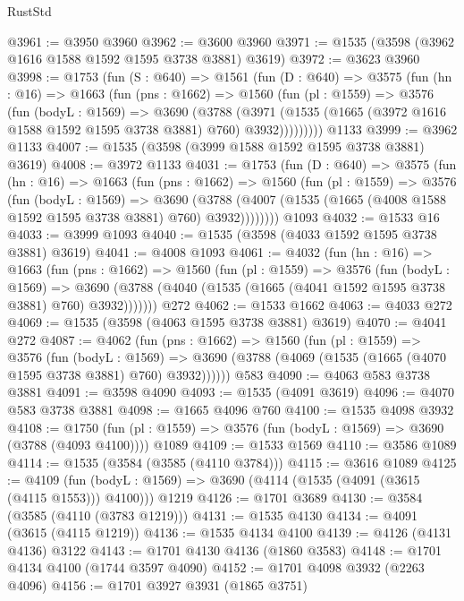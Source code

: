 \begin{lexlean}{RustStd}
\begin{coremodule}
@3961 := @3950 @3960
@3962 := @3600 @3960
@3971 := @1535 (@3598 (@3962 @1616 @1588 @1592 @1595 @3738 @3881) @3619)
@3972 := @3623 @3960
@3998 := @1753
    (fun (S : @640) =>
    @1561
      (fun (D : @640) =>
      @3575
        (fun (hn : @16) =>
        @1663
          (fun (pns : @1662) =>
          @1560
            (fun (pl : @1559) =>
            @3576
              (fun (bodyL : @1569) =>
              @3690
                (@3788
                  (@3971
                    (@1535 (@1665 (@3972 @1616 @1588 @1592 @1595 @3738 @3881) @760) @3932)))))))))
    @1133
@3999 := @3962 @1133
@4007 := @1535 (@3598 (@3999 @1588 @1592 @1595 @3738 @3881) @3619)
@4008 := @3972 @1133
@4031 := @1753
    (fun (D : @640) =>
    @3575
      (fun (hn : @16) =>
      @1663
        (fun (pns : @1662) =>
        @1560
          (fun (pl : @1559) =>
          @3576
            (fun (bodyL : @1569) =>
            @3690
              (@3788 (@4007 (@1535 (@1665 (@4008 @1588 @1592 @1595 @3738 @3881) @760) @3932))))))))
    @1093
@4032 := @1533 @16
@4033 := @3999 @1093
@4040 := @1535 (@3598 (@4033 @1592 @1595 @3738 @3881) @3619)
@4041 := @4008 @1093
@4061 := @4032
    (fun (hn : @16) =>
    @1663
      (fun (pns : @1662) =>
      @1560
        (fun (pl : @1559) =>
        @3576
          (fun (bodyL : @1569) =>
          @3690 (@3788 (@4040 (@1535 (@1665 (@4041 @1592 @1595 @3738 @3881) @760) @3932)))))))
    @272
@4062 := @1533 @1662
@4063 := @4033 @272
@4069 := @1535 (@3598 (@4063 @1595 @3738 @3881) @3619)
@4070 := @4041 @272
@4087 := @4062
    (fun (pns : @1662) =>
    @1560
      (fun (pl : @1559) =>
      @3576
        (fun (bodyL : @1569) =>
        @3690 (@3788 (@4069 (@1535 (@1665 (@4070 @1595 @3738 @3881) @760) @3932))))))
    @583
@4090 := @4063 @583 @3738 @3881
@4091 := @3598 @4090
@4093 := @1535 (@4091 @3619)
@4096 := @4070 @583 @3738 @3881
@4098 := @1665 @4096 @760
@4100 := @1535 @4098 @3932
@4108 := @1750
    (fun (pl : @1559) => @3576 (fun (bodyL : @1569) => @3690 (@3788 (@4093 @4100))))
    @1089
@4109 := @1533 @1569
@4110 := @3586 @1089
@4114 := @1535 (@3584 (@3585 (@4110 @3784)))
@4115 := @3616 @1089
@4125 := @4109
    (fun (bodyL : @1569) => @3690 (@4114 (@1535 (@4091 (@3615 (@4115 @1553))) @4100)))
    @1219
@4126 := @1701 @3689
@4130 := @3584 (@3585 (@4110 (@3783 @1219)))
@4131 := @1535 @4130
@4134 := @4091 (@3615 (@4115 @1219))
@4136 := @1535 @4134 @4100
@4139 := @4126 (@4131 @4136) @3122
@4143 := @1701 @4130 @4136 (@1860 @3583)
@4148 := @1701 @4134 @4100 (@1744 @3597 @4090)
@4152 := @1701 @4098 @3932 (@2263 @4096)
@4156 := @1701 @3927 @3931 (@1865 @3751)

\end{coremodule}
\end{lexlean}
